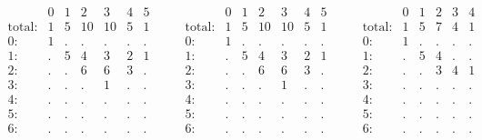 \documentclass[12pt,a3paper,landscape]{amsart}
\numberwithin{equation}{section}
\theoremstyle{plain}
\theoremstyle{definition}
\begin{document}
$$
\begin{matrix}
& 0 & 1 & 2 & 3 & 4 & 5 \\
\text{total}: & 1 & 5 & 10 & 10 & 5 & 1 \\
0: & 1 & . & . & . & . & . \\
1: & . & 5 & 4 & 3 & 2 & 1 \\
2: & . & . & 6 & 6 & 3 & . \\
3: & . & . & . & 1 & . & . \\
4: & . & . & . & . & . & . \\
5: & . & . & . & . & . & . \\
6: & . & . & . & . & . & .
\end{matrix} \quad\quad
\begin{matrix}
& 0 & 1 & 2 & 3 & 4 & 5 \\
\text{total}: & 1 & 5 & 10 & 10 & 5 & 1 \\
0: & 1 & . & . & . & . & . \\
1: & . & 5 & 4 & 3 & 2 & 1 \\
2: & . & . & 6 & 6 & 3 & . \\
3: & . & . & . & 1 & . & . \\
4: & . & . & . & . & . & . \\
5: & . & . & . & . & . & . \\
6: & . & . & . & . & . & .
\end{matrix} \quad\quad
\begin{matrix}
& 0 & 1 & 2 & 3 & 4 \\
\text{total}: & 1 & 5 & 7 & 4 & 1 \\
0: & 1 & . & . & . & . \\
1: & . & 5 & 4 & . & . \\
2: & . & . & 3 & 4 & 1 \\
3: & . & . & . & . & . \\
4: & . & . & . & . & . \\
5: & . & . & . & . & . \\
6: & . & . & . & . & .
\end{matrix}
$$
\end{document}
